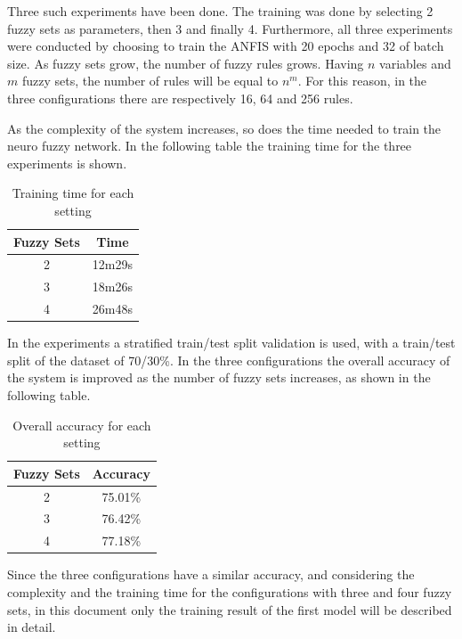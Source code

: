 \documentclass[10pt,twocolumn,letterpaper]{article}
\begin{document}
Three such experiments have been done. The training was done by selecting 2 fuzzy sets as parameters, then 3 and finally 4. Furthermore, all three experiments were conducted by choosing to train the ANFIS with 20 epochs and 32 of batch size.
As fuzzy sets grow, the number of fuzzy rules grows. Having $n$ variables and $m$ fuzzy sets, the number of rules will be equal to $n^{m}$. For this reason, in the three configurations there are respectively 16, 64 and 256 rules.

As the complexity of the system increases, so does the time needed to train the neuro fuzzy network. In the following table the training time for the three experiments is shown.

\begin{table}[h!]
\centering
\begin{tabular}{||c c||} 
 \hline
 Fuzzy Sets & Time \\ [0.5ex] 
 \hline\hline
 2 & 12m29s \\ 
 3 & 18m26s \\
 4 & 26m48s \\  [1ex] 
 \hline
\end{tabular}
\caption{Training time for each setting}
\label{table:2}
\end{table}

In the experiments a stratified train/test split validation is used, with a train/test split of the dataset of 70/30\%. In the three configurations the overall accuracy of the system is improved as the number of fuzzy sets increases, as shown in the following table. 
\begin{table}[h!]
\centering
\begin{tabular}{||c c||} 
 \hline
 Fuzzy Sets & Accuracy \\ [0.5ex] 
 \hline\hline
 2 & 75.01\% \\ 
 3 & 76.42\% \\
 4 & 77.18\% \\  [1ex] 
 \hline
\end{tabular}
\caption{Overall accuracy for each setting}
\label{table:2}
\end{table}

Since the three configurations have a similar accuracy, and considering the complexity and the training time for the configurations with three and four fuzzy sets, in this document only the training result of the first model will be described in detail.
\end{document}
